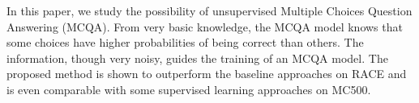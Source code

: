 In this paper, we study the possibility of unsupervised  Multiple Choices Question Answering (MCQA). From very basic knowledge, the MCQA model knows that some choices have higher probabilities of being correct than others. The information, though very noisy, guides the training of an MCQA model. The proposed method is shown to outperform the baseline approaches on RACE and is even comparable with some supervised learning approaches on MC500.
